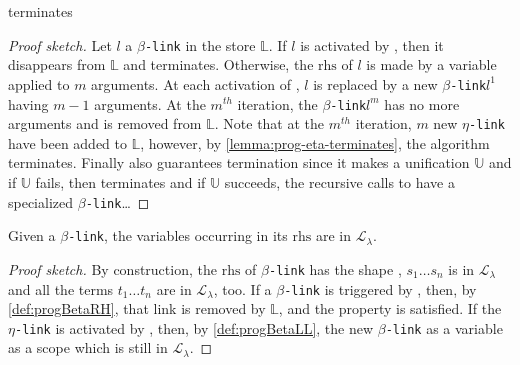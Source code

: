 \documentclass[sigconf,natbib=false,review]{acmart}
\newcommand{\llambda}{\ensuremath{\mathcal{L}_\lambda}\xspace}
\newcommand{\linkMacro}[1]{\ensuremath{#1}\texttt{-link}\xspace}
\newcommand{\linkbeta}{\linkMacro{\beta}}
\newcommand{\linketa} {\linkMacro{\eta}}
\newcommand{\rhs}{\ensuremath{\mathrm{rhs}}\xspace}
\newcommand{\linkStore}{\ensuremath{\mathbb{L}}\xspace}
\begin{document}
\begin{lemma}
   terminates
\end{lemma}

\begin{proof}[Proof sketch]
  Let $l$ a \linkbeta in the store \linkStore. If $l$ is activated by
  \progBetaRH, then it disappears from \linkStore and 
  terminates. Otherwise, the \rhs of $l$ is made by a variable applied to $m$
  arguments. At each activation of \progBetaLL, $l$ is replaced by a new
  \linkbeta $l^1$ having $m-1$ arguments. At the $m^{th}$ iteration, the
  \linkbeta $l^m$ has no more arguments and is removed from \linkStore.
  Note that at the $m^{th}$ iteration, $m$ new \linketa have been added to
  \linkStore, however, by \cref{lemma:prog-eta-terminates}, the algorithm
  terminates. Finally \progBetaDedup also guarantees termination since it 
  makes a unification $\mathbb{U}$ and if $\mathbb{U}$ fails, then 
   terminates and if $\mathbb{U}$ succeeds, 
  the recursive calls to  have a specialized \linkbeta\dots  

\end{proof}

\begin{corollary}
  Given a \linkbeta, the variables occurring in its \rhs are in \llambda.
\end{corollary}

\begin{proof}[Proof sketch]
  By construction, the \rhs of \linkbeta has the shape \rhsBeta, $s_1\dots s_n$
  is in \llambda and all the terms $t_1\dots t_n$ are in \llambda, too. If a
  \linkbeta is triggered by \progBetaRH, then, by \cref{def:progBetaRH}, that
  link is removed by \linkStore, and the property is satisfied. If the \linketa
  is activated by \progBetaLL, then, by \cref{def:progBetaLL}, the new \linkbeta
  as a variable as a scope which is still in \llambda. 
\end{proof}
\end{document}
